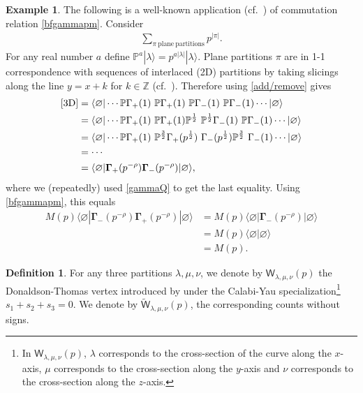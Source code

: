 \documentclass{amsart}
\theoremstyle{definition}
\newtheorem{definition}[theorem]{Definition}
\newtheorem{example}[theorem]{Example}
\newcommand{\ZZ} {\mathbb{Z}}		%
\newcommand{\PP} {\mathbb{P}}
\newcommand{\PT}{\mathrm{PT}}
\newcommand{\sfW} {\mathsf{W}}
\begin{document}
\begin{example} \label{MacMah}
The following is a well-known application (cf.~\cite{ORV}) of commutation relation \eqref{bfgammapm}. Consider
\begin{align} \label{3D}
\sum_{\pi \ \mathrm{plane \ partitions}} p^{|\pi|}.
\end{align}
For any real number $a$ define $\PP^a |\lambda\rangle = p^{a|\lambda|} |\lambda\rangle$. Plane partitions $\pi$ are in 1-1 correspondence with sequences of interlaced (2D) partitions by taking slicings along the line $y=x+k$ for $k \in \ZZ$ (cf.~\cite[Lem.~3.3.2]{You}). Therefore using \eqref{add/remove} gives 
\begin{align*}
\eqref{3D} &=\langle \varnothing | \cdots \PP \Gamma_+(1) \ \PP \Gamma_+(1) \ \PP \Gamma_-(1) \ \PP \Gamma_-(1) \cdots |\varnothing\rangle \\
&= \langle \varnothing | \cdots \PP \Gamma_+(1) \ \PP \Gamma_+(1) \PP^{\frac{1}{2}} \ \PP^{\frac{1}{2}} \Gamma_-(1) \ \PP \Gamma_-(1) \cdots |\varnothing\rangle \\
&= \langle \varnothing | \cdots \PP \Gamma_+(1) \ \PP^{\frac{3}{2}} \Gamma_+(p^{\frac{1}{2}}) \ \Gamma_-(p^{\frac{1}{2}})\PP^{\frac{3}{2}} \ \Gamma_-(1) \cdots |\varnothing\rangle \\
&= \cdots \\
&= \langle \varnothing | \mathbf{\Gamma}_{+}(p^{-\rho}) \mathbf{\Gamma}_{-}(p^{-\rho}) | \varnothing \rangle,
\end{align*}
where we (repeatedly) used \eqref{gammaQ} to get the last equality. Using \eqref{bfgammapm}, this equals
\begin{align*}
M(p) \langle \varnothing | \mathbf{\Gamma}_{-}(p^{-\rho}) \mathbf{\Gamma}_{+}(p^{-\rho}) | \varnothing \rangle &= M(p) \langle \varnothing | \mathbf{\Gamma}_{-}(p^{-\rho}) | \varnothing \rangle \\ 
&= M(p) \langle \varnothing | \varnothing \rangle \\
&= M(p).
\end{align*}
\end{example} 

\begin{definition}
For any three partitions $\lambda, \mu, \nu$, we denote by $\sfW_{\lambda,\mu,\nu}(p)$ the Donaldson-Thomas vertex introduced by \cite{MNOP1} 
under the Calabi-Yau specialization\footnote{In $\sfW_{\lambda,\mu,\nu}(p)$, $\lambda$ corresponds to the cross-section of the curve along the $x$-axis, $\mu$ corresponds to the cross-section along the $y$-axis and $\nu$ corresponds to the cross-section along the $z$-axis.}  $s_1+s_2+s_3=0$.
We denote by $\tilde{\sfW}_{\lambda,\mu,\nu}(p)$, 
the corresponding counts without signs.
\end{definition}
\end{document}
